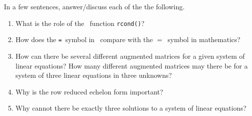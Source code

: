 \begin{exercise} \label{ex:} 
In a few sentences, answer\slash discuss each of the the following.
\begin{enumerate}
\item What is the role of the \script\ function \verb|rcond()|?

\item How does the \verb|=|~symbol in \script\ compare with the \(=\)~symbol in mathematics?

\item How can there be several different augmented matrices for a given system of linear equations?  How many different augmented matrices may there be for a system of three linear equations in three unknowns?

\item Why is the row reduced echelon form important?

\item Why cannot there be exactly three solutions to a system of linear equations?

\end{enumerate}
\end{exercise}

\begin{comment}%
why, what caused X?
how did X occur?
what-if? what-if-not?
how does X compare with Y?
what is the evidence for X?
why is X important?
\end{comment}
